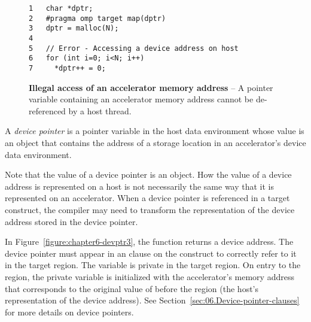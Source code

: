 \begin{figure*}[!tb]
\begin{verbatim}
1   char *dptr;
2   #pragma omp target map(dptr)
3   dptr = malloc(N);
4
5   // Error - Accessing a device address on host
6   for (int i=0; i<N; i++)
7     *dptr++ = 0;
\end{verbatim}
\caption{ \textbf {Illegal access of an accelerator memory address} -- \small
          A pointer variable containing an accelerator memory address 
          cannot be de-referenced by a host thread.
         }
\label{figure:chapter6-devptr2}
\end{figure*}

A \emph{device pointer}  is a pointer
variable in the host data environment whose value is an object that contains
the address of a storage location in an accelerator's device data environment.  

Note that the value of a device pointer is an object.  How the
value of a device address is represented on a host is not necessarily the same
way that it is represented on an accelerator.  
When a device pointer is referenced in a target construct, the compiler
may need to transform the representation of the device address stored in
the device pointer.




In Figure~\ref{figure:chapter6-devptr3}, the  function
returns a device address.  The device pointer  must appear in an
 clause on the  construct to correctly refer
to it in the target region.  The variable  is private in the target
region.  On entry to the region, the private  variable is initialized
with the accelerator's memory address that corresponds to the original value of
 before the region (the host's representation of the device address).
See Section~\ref{sec:06.Device-pointer-clauses} for more details on device
pointers.

